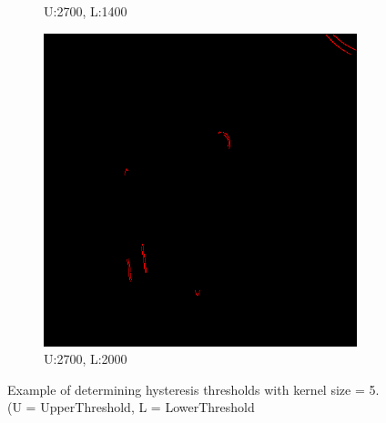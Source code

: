 \documentclass[11pt]{article}
\begin{document}
\begin{figure}[!h]
\begin{subfigure}[t]{.25\textwidth}
		\caption{U:2700, L:1400}
	\end{subfigure}
\hfill
	\begin{subfigure}[t]{.25\textwidth}
		\centering
		\includegraphics[scale=0.3]{pics/normalThreshTest/Upper2700lower2000kernel5.png}
		\caption{U:2700, L:2000}
	\end{subfigure}
	
	\caption{Example of determining hysteresis thresholds with kernel size = 5. \\(U = UpperThreshold, L = LowerThreshold}
	\label{fig:hysteresisDetermining}
\end{figure}
\end{document}
